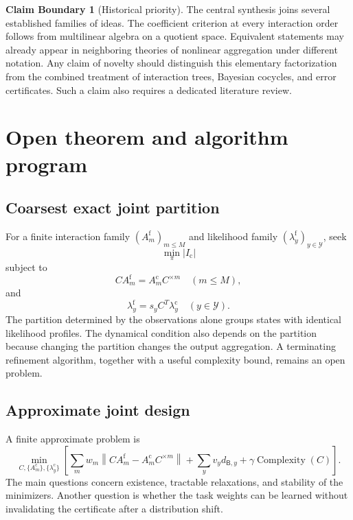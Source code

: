 \documentclass[11pt]{article}
\theoremstyle{definition}
\newtheorem{boundary}[theorem]{Claim Boundary}
\theoremstyle{remark}
\newcommand{\cY}{\mathcal Y}
\newcommand{\norm}[1]{\left\lVert #1\right\rVert}
\newcommand{\fine}{\mathrm f}
\newcommand{\coarse}{\mathrm c}
\newcommand{\Bup}{\mathsf B}
\begin{document}
\begin{boundary}[Historical priority]
The central synthesis joins several established families of ideas.  The coefficient criterion at every interaction order follows from multilinear algebra on a quotient space.  Equivalent statements may already appear in neighboring theories of nonlinear aggregation under different notation.  Any claim of novelty should distinguish this elementary factorization from the combined treatment of interaction trees, Bayesian cocycles, and error certificates.  Such a claim also requires a dedicated literature review.
\end{boundary}

\section{Open theorem and algorithm program}\label{sec:open}

\subsection{Coarsest exact joint partition}
For a finite interaction family $(A_m^{\fine})_{m\leq M}$ and likelihood family $(\lambda_y^{\fine})_{y\in\cY}$, seek
\begin{equation}\label{eq:coarsest-joint-partition}
  \min_{\pi}|I_{\coarse}|
\end{equation}
subject to
\[
  CA_m^{\fine}=A_m^{\coarse}C^{\times m}
  \quad(m\leq M),
\]
and
\[
  \lambda_y^{\fine}=s_yC^T\lambda_y^{\coarse}
  \quad(y\in\cY).
\]
The partition determined by the observations alone groups states with identical likelihood profiles.  The dynamical condition also depends on the partition because changing the partition changes the output aggregation.  A terminating refinement algorithm, together with a useful complexity bound, remains an open problem.

\subsection{Approximate joint design}
A finite approximate problem is
\[
  \min_{C,\{A_m^{\coarse}\},\{\lambda_y^{\coarse}\}}
  \left[
  \sum_mw_m\norm{CA_m^{\fine}-A_m^{\coarse}C^{\times m}}
  +\sum_yv_yd_{\Bup,y}
  +\gamma\operatorname{Complexity}(C)
  \right].
\]
The main questions concern existence, tractable relaxations, and stability of the minimizers.  Another question is whether the task weights can be learned without invalidating the certificate after a distribution shift.
\end{document}
